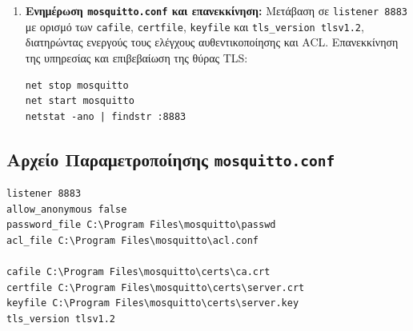 \documentclass[11pt, a4paper]{article}
\begin{document}
\begin{enumerate}
\begin{lstlisting}[language={}]
"C:\Program Files\OpenSSL-Win64\bin\openssl.exe" x509 -req -in server.csr -CA ca.crt -CAkey ca.key -CAcreateserial -out server.crt -days 365 -sha256 -extfile san.ext
\end{lstlisting}
    \item \textbf{Ενημέρωση \texttt{mosquitto.conf} και επανεκκίνηση:} Μετάβαση σε \texttt{listener 8883} με ορισμό των \texttt{cafile}, \texttt{certfile}, \texttt{keyfile} και \texttt{tls\_version tlsv1.2}, διατηρώντας ενεργούς τους ελέγχους αυθεντικοποίησης και ACL. Επανεκκίνηση της υπηρεσίας και επιβεβαίωση της θύρας TLS:
\begin{lstlisting}[language={}]
net stop mosquitto
net start mosquitto
netstat -ano | findstr :8883
\end{lstlisting}
\end{enumerate}

\subsection{Αρχείο Παραμετροποίησης \texttt{mosquitto.conf}}
\begin{lstlisting}[language={}]
listener 8883
allow_anonymous false
password_file C:\Program Files\mosquitto\passwd
acl_file C:\Program Files\mosquitto\acl.conf

cafile C:\Program Files\mosquitto\certs\ca.crt
certfile C:\Program Files\mosquitto\certs\server.crt
keyfile C:\Program Files\mosquitto\certs\server.key
tls_version tlsv1.2
\end{lstlisting}
\end{document}
